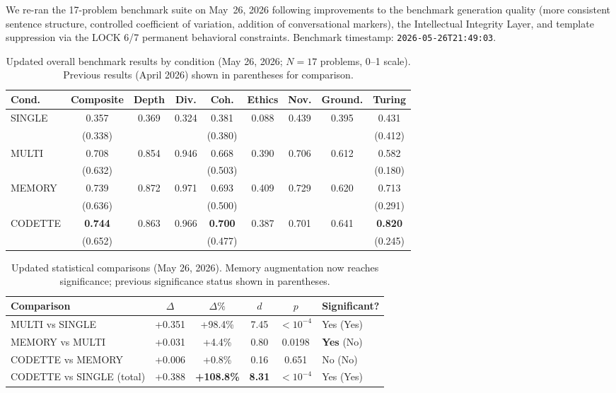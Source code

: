 \documentclass[11pt,a4paper]{article}
\begin{document}
We re-ran the 17-problem benchmark suite on May~26, 2026 following
improvements to the benchmark generation quality (more consistent sentence
structure, controlled coefficient of variation, addition of conversational
markers), the Intellectual Integrity Layer, and template suppression via
the LOCK 6/7 permanent behavioral constraints. Benchmark timestamp:
\texttt{2026-05-26T21:49:03}.

\begin{table}[ht]
\centering
\caption{Updated overall benchmark results by condition (May 26, 2026;
$N=17$ problems, 0--1 scale). Previous results (April 2026) shown in
parentheses for comparison.}
\label{tab:results-v8}
\begin{tabular}{lcccccccc}
\toprule
\textbf{Cond.} & \textbf{Composite} & \textbf{Depth} & \textbf{Div.} &
  \textbf{Coh.} & \textbf{Ethics} & \textbf{Nov.} & \textbf{Ground.} &
  \textbf{Turing} \\
\midrule
SINGLE  & 0.357 & 0.369 & 0.324 & 0.381 & 0.088 & 0.439 & 0.395 & 0.431 \\
        & \scriptsize(0.338) & & & \scriptsize(0.380) & & & & \scriptsize(0.412)\\
MULTI   & 0.708 & 0.854 & 0.946 & 0.668 & 0.390 & 0.706 & 0.612 & 0.582 \\
        & \scriptsize(0.632) & & & \scriptsize(0.503) & & & & \scriptsize(0.180)\\
MEMORY  & 0.739 & 0.872 & 0.971 & 0.693 & 0.409 & 0.729 & 0.620 & 0.713 \\
        & \scriptsize(0.636) & & & \scriptsize(0.500) & & & & \scriptsize(0.291)\\
CODETTE & \textbf{0.744} & 0.863 & 0.966 & \textbf{0.700} & 0.387 & 0.701 & 0.641 & \textbf{0.820}\\
        & \scriptsize(0.652) & & & \scriptsize(0.477) & & & & \scriptsize(0.245)\\
\bottomrule
\end{tabular}
\end{table}

\begin{table}[ht]
\centering
\caption{Updated statistical comparisons (May 26, 2026). Memory augmentation
now reaches significance; previous significance status shown in parentheses.}
\label{tab:stats-v8}
\begin{tabular}{lccccl}
\toprule
\textbf{Comparison} & \textbf{$\Delta$} & \textbf{$\Delta\%$} &
  \textbf{$d$} & \textbf{$p$} & \textbf{Significant?} \\
\midrule
MULTI vs SINGLE           & +0.351 & +98.4\%  & 7.45 & $<10^{-4}$ & Yes (Yes) \\
MEMORY vs MULTI           & +0.031 & +4.4\%   & 0.80 & 0.0198     & \textbf{Yes} (No) \\
CODETTE vs MEMORY         & +0.006 & +0.8\%   & 0.16 & 0.651      & No (No) \\
CODETTE vs SINGLE (total) & +0.388 & \textbf{+108.8\%} & \textbf{8.31} & $<10^{-4}$ & Yes (Yes) \\
\bottomrule
\end{tabular}
\end{table}
\end{document}
